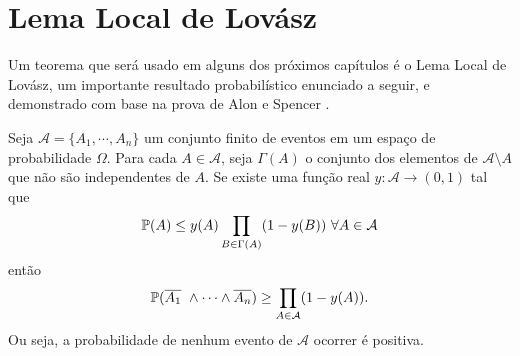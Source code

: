 

\section{Lema Local de Lovász}

Um teorema que será usado em alguns dos próximos capítulos é o Lema Local de Lovász, um importante resultado probabilístico enunciado a seguir, e demonstrado com base na prova de Alon e Spencer \cite{alon2004probabilistic}.

\begin{teorema}\label{LLL}
Seja $\mathcal{A} = \{A_1, \cdots, A_n\}$ um conjunto finito de eventos em um espaço de probabilidade $\Omega$. Para cada $A\in \mathcal{A}$, seja $\Gamma(A)$ o conjunto dos elementos de $\mathcal{A}\setminus A$ que não são independentes de $A$. Se existe uma função real $y : \mathcal{A} \rightarrow (0,1)$ tal que
\[\mathbb{P}(A)\leq y(A) \prod_{B\in \Gamma(A)}(1-y(B))\ \forall A\in \mathcal{A}\]
então 
\[\mathbb{P}(\overline{A_1}\ \wedge \cdots \wedge \overline{A_n}) \geq \prod_{A\in\mathcal{A}}(1-y(A)).\]
Ou seja, a probabilidade de nenhum evento de $\mathcal{A}$ ocorrer é positiva.
\end{teorema}

